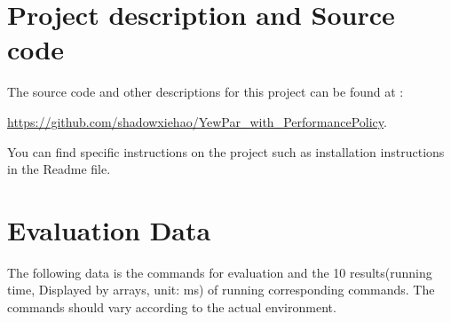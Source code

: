 \documentclass{mproj}
\begin{document}
\section{Project description and Source code}

The source code and other descriptions for this project can be found at :

\url{https://github.com/shadowxiehao/YewPar_with_PerformancePolicy}.

You can find specific instructions on the project such as installation instructions in the Readme file.

\section{Evaluation Data}

The following data is the commands for evaluation and the 10 results(running time, Displayed by arrays, unit: ms) of running corresponding commands.
The commands should vary according to the actual environment.
\end{document}
